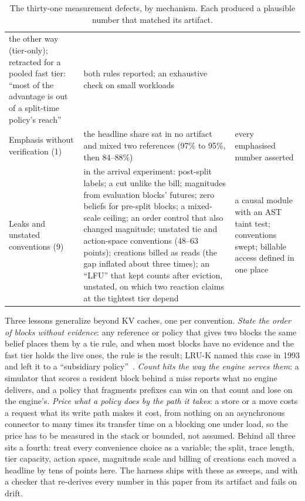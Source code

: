 \begin{table}[t]
\begin{tabular}{@{}p{3.2cm}p{8.6cm}p{4.9cm}@{}}
the other way (tier-only); retracted for a pooled fast tier: ``most of the advantage is out of a split-time policy's reach'' &
both rules reported; an exhaustive check on small workloads \\
Emphasis without verification (1) & the headline share sat in no artifact and mixed two references
(97\% to 95\%, then 84--88\%) & every emphasised number asserted \\
Leaks and unstated conventions (9) & in the arrival experiment: post-split labels; a cut unlike the bill;
magnitudes from evaluation blocks' futures; zero beliefs for pre-split blocks; a mixed-scale ceiling; an
order control that also changed magnitude; unstated tie and action-space conventions (48--63 points);
creations billed as reads (the gap inflated about three times); an ``LFU'' that kept counts after eviction,
unstated, on which two reaction claims at the tightest tier depend & a causal module with an AST taint test;
conventions swept; billable access defined in one place \\
\bottomrule
\end{tabular}
\caption{The thirty-one measurement defects, by mechanism. Each produced a plausible number that matched
its artifact.}
\label{tab:defects}
\end{table}

Three lessons generalize beyond KV caches, one per convention. \emph{State the order of blocks without
evidence}: any reference or policy that gives two blocks the same belief places them by a tie rule, and when
most blocks have no evidence and the fast tier holds the live ones, the rule is the result; LRU-K named this case in 1993 and left it to a
``subsidiary policy''~\cite{oneil1993lruk}. \emph{Count hits the way the engine serves them}: a simulator
that scores a resident block behind a miss reports what no engine delivers, and a policy that fragments
prefixes can win on that count and lose on the engine's. \emph{Price what a policy does by the path it
takes}: a store or a move costs a request what its write path makes it cost, from nothing on an asynchronous
connector to many times its transfer time on a blocking one under load, so the price has to be measured in
the stack or bounded, not assumed. Behind all three sits a fourth: treat every convenience choice as a
variable; the split, trace length, tier capacity, action space, magnitude scale and billing of creations each moved
a headline by tens of points here. The harness ships with these as sweeps, and with a checker that re-derives every number in
this paper from its artifact and fails on drift.
